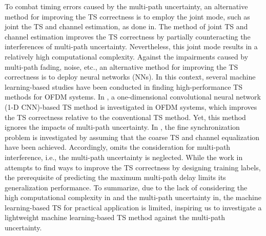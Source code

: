 \documentclass[conference]{IEEEtran}
\begin{document}
To combat timing errors caused by the multi-path uncertainty, an alternative method for improving the TS correctness is to employ the joint mode, such as joint the TS and channel estimation, as done in\cite{ref:JSandCE}.
The method of joint TS and channel estimation\cite{ref:JSandCE} improves the TS correctness by partially counteracting the interferences of multi-path uncertainty. Nevertheless, this joint mode \cite{ref:JSandCE} results in a relatively high computational complexity.
Against the impairments caused by multi-path fading, noise, etc., an alternative method for improving the TS correctness is to deploy neural networks (NNs).
In this context, several machine learning-based studies have been conducted in finding high-performance TS methods for OFDM systems\cite{ref:CNNPD,ref:ELM-FTS,ref:ELM-labelTS}.
In \cite{ref:CNNPD}, a one-dimensional convolutional neural network (1-D CNN)-based TS method is investigated in OFDM systems, which improves the TS correctness relative to the conventional TS method.
Yet, this method ignores the impacts of multi-path uncertainty.
In \cite{ref:ELM-FTS}, the fine synchronization problem is investigated by assuming that the coarse TS and channel equalization have been achieved. Accordingly, \cite{ref:ELM-FTS} omits the consideration for multi-path interference, i.e., the multi-path uncertainty is neglected.
While the work in \cite{ref:ELM-labelTS} attempts to find ways to improve the TS correctness by designing training labels, the prerequisite of predicting the maximum multi-path delay limits its generalization performance.
To summarize, due to the lack of considering the high computational complexity in\cite{ref:JSandCE} and the multi-path uncertainty in\cite{ref:CNNPD,ref:ELM-FTS,ref:ELM-labelTS}, the machine learning-based TS for practical application is limited, inspiring us to investigate a lightweight machine learning-based TS method against the multi-path uncertainty.
\end{document}
